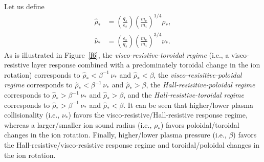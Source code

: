 \documentclass[notitlepage,12pt]{article}
\begin{document}
Let us define 
\begin{align}
\hat{\rho}_\ast&= \left(\frac{q_s}{\epsilon_s}\right)\left(\frac{m_e}{m_i}\right)^{1/4}\rho_\ast,\\[0.5ex]
\hat{\nu}_\ast&=\left(\frac{\epsilon_s}{q_s}\right)\left(\frac{m_e}{m_i}\right)^{3/4}\nu_\ast.
\end{align}
As is illustrated in Figure~\ref{f6}, the {\em visco-resistive-toroidal regime}\/ (i.e., a visco-resistive layer response
combined with a predominately toroidal change in the ion rotation) corresponds to $\hat{\rho}_\ast < \beta^{-1}\,\nu_\ast$ 
and $\hat{\rho}_\ast <\beta$, the {\em visco-resisitive-poloidal regime}\/ corresponds to 
 $\hat{\rho}_\ast<\beta^{-1}\,\nu_\ast$ and $\hat{\rho}_\ast > \beta$, the {\em Hall-resisitive-poloidal regime}\/ corresponds to  
 $\hat{\rho}_\ast>\beta^{-1}\,\nu_\ast$ and $\hat{\rho}_\ast > \beta$, and the {\em Hall-resistive-toroidal regime}\/ corresponds to   
 $\hat{\rho}_\ast>\beta^{-1}\,\nu_\ast$ and $\hat{\rho}_\ast < \beta$.
It can be seen that higher/lower plasma collisionality (i.e., $\nu_\ast$) favors the visco-resistive/Hall-resistive response regime, whereas a
larger/smaller ion sound radius (i.e., $\rho_\ast$) favors poloidal/toroidal changes in the ion rotation. Finally, higher/lower plasma
pressure (i.e., $\beta$) 
favors the Hall-resistive/visco-resistive response regime and toroidal/poloidal changes in the ion rotation. 
\end{document}
